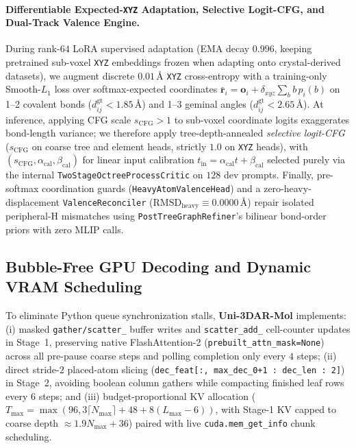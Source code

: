 \documentclass[11pt,a4paper]{article}
\begin{document}
\paragraph{Differentiable Expected-\texttt{XYZ} Adaptation, Selective Logit-CFG, and Dual-Track Valence Engine.}
During rank-$64$ LoRA \citep{hu2022lora} supervised adaptation (EMA decay $0.996$, keeping pretrained sub-voxel \texttt{XYZ} embeddings frozen when adapting onto crystal-derived datasets), we augment discrete $0.01\,\text{\AA}$ \texttt{XYZ} cross-entropy with a training-only Smooth-$L_1$ loss over softmax-expected coordinates $\bar{\mathbf{r}}_i = \mathbf{o}_i + \delta_{xyz}\sum_b b\,p_i(b)$ on 1--2 covalent bonds ($d_{ij}^{\text{gt}} < 1.85\,\text{\AA}$) and 1--3 geminal angles ($d_{ij}^{\text{gt}} < 2.65\,\text{\AA}$). At inference, applying CFG scale $s_{\text{CFG}} > 1$ to sub-voxel coordinate logits exaggerates bond-length variance; we therefore apply tree-depth-annealed \emph{selective logit-CFG} ($s_{\text{CFG}}$ on coarse tree and element heads, strictly $1.0$ on \texttt{XYZ} heads), with $(s_{\text{CFG}}, \alpha_{\text{cal}}, \beta_{\text{cal}})$ for linear input calibration $t_{\text{in}} = \alpha_{\text{cal}} t + \beta_{\text{cal}}$ selected purely via the internal \texttt{TwoStage\allowbreak Octree\allowbreak ProcessCritic} on $128$ dev prompts. Finally, pre-softmax coordination guards (\texttt{HeavyAtom\allowbreak ValenceHead}) and a zero-heavy-displacement \texttt{Valence\allowbreak Reconciler} ($\text{RMSD}_{\text{heavy}} \equiv 0.0000\,\text{\AA}$) repair isolated peripheral-H mismatches using \texttt{PostTree\allowbreak Graph\allowbreak Refiner}'s bilinear bond-order priors with zero MLIP calls.

\subsection{Bubble-Free GPU Decoding and Dynamic VRAM Scheduling}
\label{sec:engine}

To eliminate Python queue synchronization stalls, \textbf{Uni-3DAR-Mol} implements: (i) masked \texttt{gather/\allowbreak scatter\_} buffer writes and \texttt{scatter\_add\_} cell-counter updates in Stage~1, preserving native FlashAttention-2 (\texttt{prebuilt\_attn\_mask=None}) across all pre-pause coarse steps and polling completion only every $4$ steps; (ii) direct stride-$2$ placed-atom slicing (\texttt{dec\_feat[:, max\_dec\_0+1 : dec\_len : 2]}) in Stage~2, avoiding boolean column gathers while compacting finished leaf rows every $6$ steps; and (iii) budget-proportional KV allocation ($T_{\max} = \max(96, 3\lceil N_{\max}\rceil + 48 + 8(L_{\max}-6))$, with Stage-1 KV capped to coarse depth $\approx 1.9 N_{\max} + 36$) paired with live \texttt{cuda.mem\_get\_info} chunk scheduling.
\end{document}
